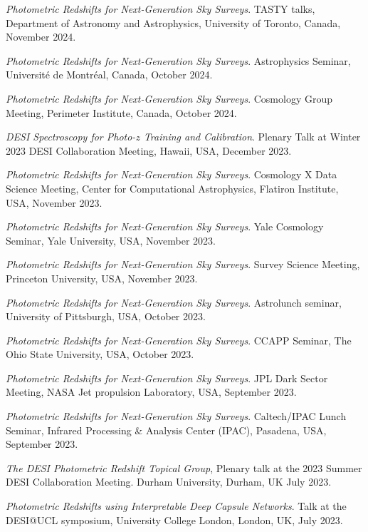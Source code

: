 
 \begin{etaremune}[leftmargin=40pt,labelsep=10pt]
    \item \textit{Photometric Redshifts for Next-Generation Sky Surveys}. TASTY talks, Department of Astronomy and Astrophysics, University of Toronto, Canada, November 2024.
    \item \textit{Photometric Redshifts for Next-Generation Sky Surveys}. Astrophysics Seminar, Université de Montréal, Canada, October 2024.
    \item \textit{Photometric Redshifts for Next-Generation Sky Surveys}. Cosmology Group Meeting, Perimeter Institute, Canada, October 2024.
     \item \textit{DESI Spectroscopy for Photo-$z$ Training and Calibration}. Plenary Talk at Winter 2023 DESI Collaboration Meeting, Hawaii, USA, December 2023.
    \item \textit{Photometric Redshifts for Next-Generation Sky Surveys}. Cosmology X Data Science Meeting, Center for Computational Astrophysics, Flatiron Institute, USA, November 2023.
    \item \textit{Photometric Redshifts for Next-Generation Sky Surveys}. Yale Cosmology Seminar, Yale University, USA, November 2023.
    \item \textit{Photometric Redshifts for Next-Generation Sky Surveys}. Survey Science Meeting, Princeton University, USA, November 2023.
    \item \textit{Photometric Redshifts for Next-Generation Sky Surveys}. Astrolunch seminar, University of Pittsburgh, USA, October 2023.
    \item \textit{Photometric Redshifts for Next-Generation Sky Surveys}. CCAPP Seminar, The Ohio State University, USA, October 2023.
    \item \textit{Photometric Redshifts for Next-Generation Sky Surveys}. JPL Dark Sector Meeting, NASA Jet propulsion Laboratory, USA, September 2023.
    \item \textit{Photometric Redshifts for Next-Generation Sky Surveys}. Caltech/IPAC Lunch Seminar, Infrared Processing \& Analysis Center (IPAC), Pasadena, USA, September 2023.
    \item \textit{The DESI Photometric Redshift Topical Group}, Plenary talk at the 2023 Summer DESI Collaboration Meeting. Durham University, Durham, UK July 2023.
    \item \textit{Photometric Redshifts using Interpretable Deep Capsule Networks}. Talk at the DESI@UCL symposium, University College London, London, UK, July 2023.

\end{etaremune}
